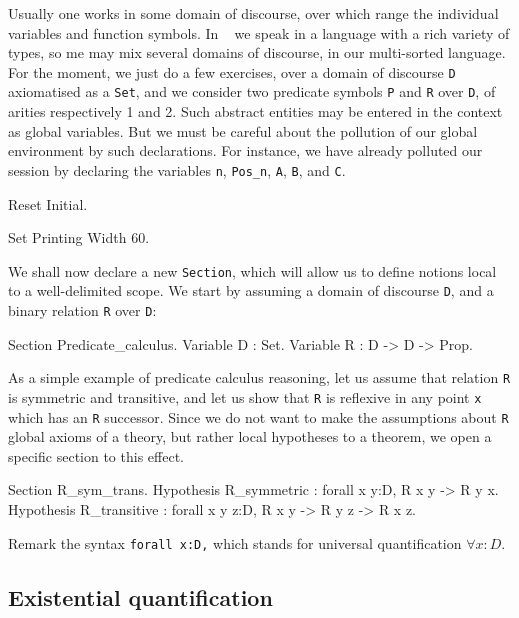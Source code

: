 \documentclass[11pt,a4paper]{book}
\begin{document}
Usually one works in some domain of discourse, over which range the individual 
variables and function symbols. In \Coq~ we speak in a language with a rich 
variety of types, so me may mix several domains of discourse, in our 
multi-sorted language. For the moment, we just do a few exercises, over a 
domain of discourse \verb:D: axiomatised as a \verb:Set:, and we consider two 
predicate symbols  \verb:P: and \verb:R: over \verb:D:, of arities 
respectively 1 and 2. Such abstract entities may be entered in the context
as global variables. But we must be careful about the pollution of our
global environment by such declarations. For instance, we have already 
polluted our \Coq~ session by declaring the variables
\verb:n:, \verb:Pos_n:, \verb:A:, \verb:B:, and \verb:C:.

\begin{coq_example}
Reset Initial.
\end{coq_example}
\begin{coq_eval}
Set Printing Width 60.
\end{coq_eval}

We shall now declare a new \verb:Section:, which will allow us to define
notions local to a well-delimited scope. We start by assuming a domain of
discourse \verb:D:, and a binary relation \verb:R:  over \verb:D:: 
\begin{coq_example}
Section Predicate_calculus.
Variable D : Set.
Variable R : D -> D -> Prop.
\end{coq_example}

As a simple example of predicate calculus reasoning, let us assume
that relation \verb:R: is symmetric and transitive, and let us show that
\verb:R: is reflexive in any point \verb:x: which has an \verb:R: successor.
Since we do not want to make the assumptions about \verb:R: global axioms of 
a theory, but rather local hypotheses to a theorem, we open a specific
section to this effect.
\begin{coq_example}
Section R_sym_trans.
Hypothesis R_symmetric : forall x y:D, R x y -> R y x.
Hypothesis R_transitive : forall x y z:D, R x y -> R y z -> R x z.
\end{coq_example}

Remark the syntax \verb+forall x:D,+ which stands for universal quantification
$\forall x : D$.

\subsection{Existential quantification}
\end{document}
